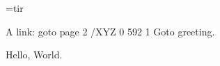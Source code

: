 \font\tenrm=tir
\tenrm

A link:
\pdfstartlink goto page 2 {/XYZ 0 592 1}
Goto greeting.
\pdfendlink

\vfill\eject

Hello, World.

\bye



